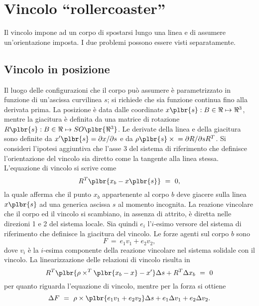 \documentclass[12pt,dvips,fleqn,italian]{article}
\begin{document}
\section*{Vincolo ``rollercoaster''}
Il vincolo impone ad un corpo di spostarsi lungo una linea e di assumere
un'orientazione imposta.
I due problemi possono essere visti separatamente.



\subsection*{Vincolo in posizione}
Il luogo delle configurazioni che il corpo pu\`{o} assumere \`{e}
parametrizzato in funzione di un'ascissa curvilinea $ s $; si richiede che
sia funzione continua fino alla derivata prima.
La posizione \`{e} data dalle coordinate $ x\plbr{s}:B\in\Re\mapsto\Re^3 $,
mentre la giacitura \`{e} definita da una matrice di rotazione
$ R\plbr{s}:B\in\Re\mapsto{SO\plbr{\Re^3}} $.
Le derivate della linea e della giacitura sono definite da
$ x'\plbr{s}=\partial{x}/\partial{s} $ e da
$ \rho\plbr{s}\times{}=\partial{R}/\partial{s}R^T $.
Si consideri l'ipotesi aggiuntiva che l'asse 3 del sistema di riferimento
che definisce l'orientazione del vincolo sia diretto come la tangente alla
linea stessa.
L'equazione di vincolo si scrive come
\begin{displaymath}
    R^T \plbr{ x_b - x\plbr{s} } \ = \ 0 ,
\end{displaymath}
la quale afferma che il punto $ x_b $ appartenente al corpo $ b $ deve
giacere sulla linea $ x\plbr{s} $ ad una generica ascissa $ s $ al momento
incognita.
La reazione vincolare che il corpo ed il vincolo si scambiano, in assenza di
attrito, \`{e} diretta nelle direzioni 1 e 2 del sistema locale.
Sia quindi $ e_i $ l'$i$-esimo versore del sistema di riferimento che
definisce la giacitura del vincolo.
Le forze agenti sul corpo $ b $ sono
\begin{displaymath}
    F \ = \ e_1 v_1 + e_2 v_2 ,
\end{displaymath}
dove $ v_i $ \`{e} la $i$-esima componente della reazione vincolare nel
sistema solidale con il vincolo.
La linearizzazione delle relazioni di vincolo risulta in
\begin{displaymath}
    R^T \plbr{ \rho \times^T \plbr{ x_b - x } - x' }\Delta{s}
    + R^T \Delta{x_b} \ = \ 0
\end{displaymath}
per quanto riguarda l'equazione di vincolo, mentre per la forza si ottiene
\begin{displaymath}
    \Delta{F} \ = \ 
        \rho \times \plbr{ e_1 v_1 + e_2 v_2 } \Delta{s}
	+ e_1 \Delta{v_1} + e_2 \Delta{v_2} .
\end{displaymath}
\end{document}
